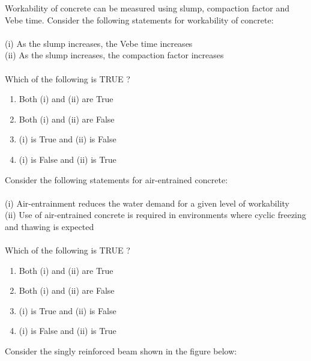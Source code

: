\iffalse
\chapter{2015}
\author{AI24BTECH11009}
\section{ce}
\fi

\item Workability of concrete can be measured using slump, compaction factor and Vebe time. Consider the following statements for workability of concrete: \\\\
(i) As the slump increases, the Vebe time increases \\
(ii) As the slump increases, the compaction factor increases \\
\\
Which of the following is TRUE ?
\begin{enumerate}
    \item Both (i) and (ii) are True
    \item Both (i) and (ii) are False
    \item (i) is True and (ii) is False
    \item (i) is False and (ii) is True \\
\end{enumerate}
\item Consider the following statements for air-entrained concrete: \\\\
(i) Air-entrainment reduces the water demand for a given level of workability \\
(ii) Use of air-entrained concrete is required in environments where cyclic freezing and thawing is expected \\
\\
Which of the following is TRUE ?
\begin{enumerate}
    \item Both (i) and (ii) are True
    \item Both (i) and (ii) are False
    \item (i) is True and (ii) is False
    \item (i) is False and (ii) is True \\
\end{enumerate}
\item Consider the singly reinforced beam shown in the figure below:
\begin{figure}[!ht]
\centering
\resizebox{0.5\textwidth}{!}{%

}%
\end{figure} \\
